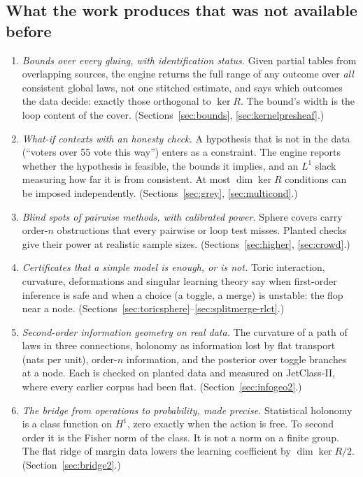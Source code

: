 \documentclass[11pt]{article}
\theoremstyle{definition}
\theoremstyle{remark}
\begin{document}
\subsection*{What the work produces that was not available before}
\begin{enumerate}
  \item \emph{Bounds over every gluing, with identification status.} Given partial tables from overlapping sources, the engine returns the full range of any outcome over \emph{all} consistent global laws, not one stitched estimate, and says which outcomes the data decide: exactly those orthogonal to $\ker R$. The bound's width is the loop content of the cover. (Sections~\ref{sec:bounds}, \ref{sec:kernelpresheaf}.)
  \item \emph{What-if contexts with an honesty check.} A hypothesis that is not in the data (``voters over 55 vote this way'') enters as a constraint. The engine reports whether the hypothesis is feasible, the bounds it implies, and an $L^1$ slack measuring how far it is from consistent. At most $\dim\ker R$ conditions can be imposed independently. (Sections~\ref{sec:grey}, \ref{sec:multicond}.)
  \item \emph{Blind spots of pairwise methods, with calibrated power.} Sphere covers carry order-$n$ obstructions that every pairwise or loop test misses. Planted checks give their power at realistic sample sizes. (Sections~\ref{sec:higher}, \ref{sec:crowd}.)
  \item \emph{Certificates that a simple model is enough, or is not.} Toric interaction, curvature, deformations and singular learning theory say when first-order inference is safe and when a choice (a toggle, a merge) is unstable: the flop near a node. (Sections~\ref{sec:toricsphere}--\ref{sec:splitmerge-rlct}.)
  \item \emph{Second-order information geometry on real data.} The curvature of a path of laws in three connections, holonomy as information lost by flat transport (nats per unit), order-$n$ information, and the posterior over toggle branches at a node. Each is checked on planted data and measured on JetClass-II, where every earlier corpus had been flat. (Section~\ref{sec:infogeo2}.)
  \item \emph{The bridge from operations to probability, made precise.} Statistical holonomy is a class function on $H^1$, zero exactly when the action is free. To second order it is the Fisher norm of the class. It is not a norm on a finite group. The flat ridge of margin data lowers the learning coefficient by $\dim\ker R/2$. (Section~\ref{sec:bridge2}.)

\end{enumerate}
\end{document}
